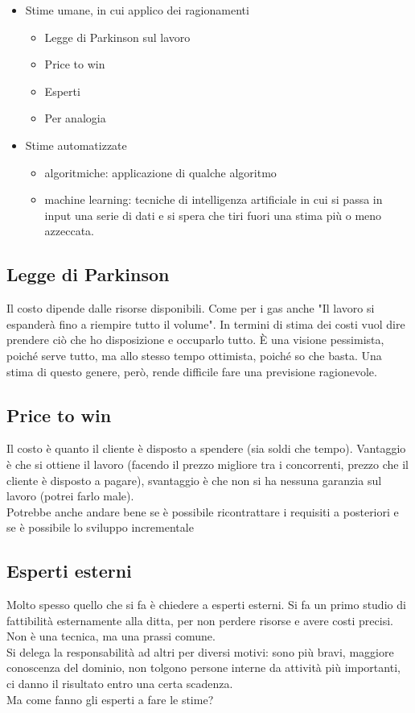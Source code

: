 \begin{itemize}
    \item Stime umane, in cui applico dei ragionamenti
    \begin{itemize}
        \item Legge di Parkinson sul lavoro
        \item Price to win
        \item Esperti
        \item Per analogia
    \end{itemize}
    \item Stime automatizzate
    \begin{itemize}
        \item algoritmiche: applicazione di qualche algoritmo
        \item machine learning: tecniche di intelligenza artificiale in cui si passa in input una serie di dati e si spera che tiri fuori una stima più o meno azzeccata.
    \end{itemize}
\end{itemize}

\subsection{Legge di Parkinson}
Il costo dipende dalle risorse disponibili. Come per i gas anche "Il lavoro si espanderà fino a riempire tutto il volume". In termini di stima dei costi vuol dire prendere ciò che ho disposizione e occuparlo tutto. È una visione pessimista, poiché serve tutto, ma allo stesso tempo ottimista, poiché so che basta. Una stima di questo genere, però, rende difficile fare una previsione ragionevole.

\subsection{Price to win}
Il costo è quanto il cliente è disposto a spendere (sia soldi che tempo). Vantaggio è che si ottiene il lavoro (facendo il prezzo migliore tra i concorrenti, prezzo che il cliente è disposto a pagare), svantaggio è che non si ha nessuna garanzia sul lavoro (potrei farlo male).\\
Potrebbe anche andare bene se è possibile ricontrattare i requisiti a posteriori e se è possibile lo sviluppo incrementale

\subsection{Esperti esterni}
Molto spesso quello che si fa è chiedere a esperti esterni. Si fa un primo studio di fattibilità esternamente alla ditta, per non perdere risorse e avere costi precisi. Non è una tecnica, ma una prassi comune.\\
Si delega la responsabilità ad altri per diversi motivi: sono più bravi, maggiore conoscenza del dominio, non tolgono persone interne da attività più importanti, ci danno il risultato entro una certa scadenza. \\
Ma come fanno gli esperti a fare le stime?

